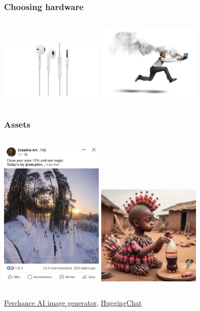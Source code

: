 \documentclass{beamer}
\begin{document}
\begin{frame}
	\frametitle{Choosing hardware}

	\begin{columns}
		\includegraphics[width=5cm, center]{apple-earpods.jpg}
		\includegraphics[width=5cm, center]{laptop-overheating.jpg}
	\end{columns}
\end{frame}

\begin{frame}
	\frametitle{Assets}
	\begin{columns}
		\column{0.5\textwidth}
		\includegraphics[width=5cm, center]{jesus-ai-slop.jpg}
		\column{0.5\textwidth}
		\includegraphics[width=5cm, center]{baby-with-chicken.png}
	\end{columns}

	\begin{center}
		\href{https://perchance.org/ai-text-to-image-generator}{Perchance AI image generator},
		\href{https://huggingface.co/chat}{HuggingChat}
	\end{center}
\end{frame}
\end{document}
